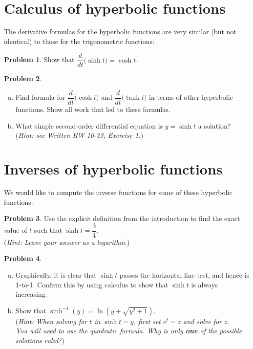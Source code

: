 \documentclass[11pt,reqno,final]{amsart}
\numberwithin{equation}{section}
\numberwithin{figure}{section}
\theoremstyle{definition} %
\newtheorem{question}{Problem}
\begin{document}
\section{Calculus of hyperbolic functions}

        The derivative formulas for the hyperbolic functions are very similar (but not identical) to those for the trigonometric functions:

\begin{question}
        Show that $\dfrac{d}{dt}\Big( \sinh t \Big) = \cosh t$.
\end{question}

\begin{question}
        $ $
        \begin{enumerate}[(a)]                
        \item Find formula for $\dfrac{d}{dt}\Big( \cosh t \Big)$ and $\dfrac{d}{dt}\Big( \tanh t \Big)$ in terms of other hyperbolic functions.
                Show all work that led to these formulas.
        \item What simple second-order differential equation is $y = \sinh t$ a solution?\\
                (\textit{Hint: see Written HW 10-23, Exercise 1.})
        \end{enumerate}
\end{question}

\vfill

\newpage

\section{Inverses of hyperbolic functions}

We would like to compute the inverse functions for some of these hyperbolic functions.

\begin{question}
        Use the explicit definition from the introduction to find the exact value of $t$ such that $\sinh t = \dfrac{3}{4}$.\\
        (\textit{Hint: Leave your answer as a logarithm.})
\end{question}

\begin{question}
        $ $
        \begin{enumerate}[(a)]
        \item Graphically, it is clear that $\sinh t$ passes the horizontal line test, and hence is 1-to-1.
                Confirm this by using calculus to show that $\sinh t$ is always increasing.
        \item Show that $\sinh^{-1}(y) = \ln(y + \sqrt{y^2+1})$.\\
                (\textit{Hint: When solving for $t$ in $\sinh t = y$, first set $e^t = z$ and solve for $z$.\\
                You will need to use the quadratic formula. Why is only \textbf{one} of the possible solutions valid?})
        \end{enumerate}
\end{question}
\end{document}
